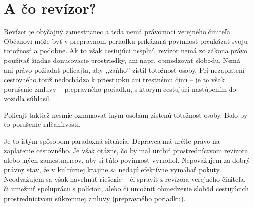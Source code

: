 \documentclass[openany]{book}
\begin{document}



\chapter{A čo revízor?}
Revízor je obyčajný zamestnanec a teda nemá právomoci verejného činiteľa. Občanovi môže byť v prepravnom poriadku prikázaná povinnosť preukázať svoju totožnosť a podobne. Ak to však cestujúci nesplní, revízor nemá zo zákona právo používať žiadne donucovacie prostriedky, ani napr. obmedzovať slobodu. Nemá ani právo požiadať policajta, aby ,,zaňho'' zistil totožnosť osoby. Pri nezaplatení cestovného totiž nedochádza k priestupku ani trestnému činu -- je to však porušenie zmluvy -- prepravného poriadku, s ktorým cestujúci nastúpením do vozidla súhlasil.

Policajt taktiež nesmie oznamovať iným osobám zistenú totožnosť osoby. Bolo by to porušenie mlčanlivosti.

Je to istým spôsobom paradoxná situácia. Dopravca má určite právo na zaplatenie cestovného. Je však otázne, čo by mal urobiť prostredníctvom revízora alebo iných zamestnancov, aby si túto povinnosť vymohol. Nepovažujem za dobrý právny stav, že v kultúrnej krajine sa nedajú efektívne vymáhať pokuty. Neodvažujem sa však navrhnúť riešenie -- či spraviť z revízora verejného činiteľa, či umožniť spoluprácu s políciou, alebo či umožniť obmedzenie slobôd cestujúcich prostredníctvom súkromnej zmluvy (prepravného poriadku). 
\end{document}
